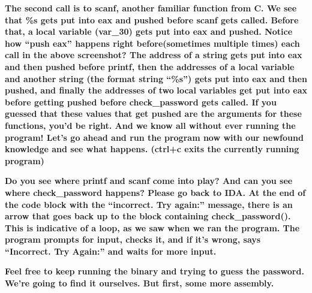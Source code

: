 \documentclass[letterpaper]{article}
\newcommand{\sitfig}[3]{
\begin{figure}[H]
\centering
\makebox[\textwidth][c]{
#2
}
\label{#1}
\end{figure}
}
\newcommand{\sitgfx}[4][scale=1.0]{
\sitfig{#3}{\texttt{[image: \#2]}}{#4}
}
\begin{document}
  
\sitgfx[width=6.5in,height=4.611in]{reversing-img014.png}{fig:unk}{TODO CAPTION}
 \textbf{\newline
The second call is to scanf, another familiar function from C. We see that \%s gets put into eax and pushed before scanf
gets called. Before that, a }\textbf{\textcolor[rgb]{0.21960784,0.4627451,0.11372549}{local variable
}}\textbf{(var\_30) gets put into eax and pushed. Notice how ``push eax'' happens right before(sometimes multiple
times) each call in the above screenshot? The address of a string gets put into eax and then pushed before printf, then
the addresses of a local variable and another string (the format string ``\%s'') gets put into eax and then pushed, and
finally the addresses of two }\textbf{\textcolor[rgb]{0.21960784,0.4627451,0.11372549}{local variables }}\textbf{get
put into eax before getting pushed before check\_password gets called. If you guessed that these values that get pushed
are the arguments for these functions, you'd be right. And we know all without ever running the program! Let's go ahead
and run the program now with our newfound knowledge and see what happens. (ctrl+c exits the currently running
program)\newline
}  
\sitgfx[width=6.5in,height=1.139in]{reversing-img015.png}{fig:unk}{TODO CAPTION}
 

\textbf{Do you see where printf and scanf come into play? And can you see where check\_password happens? Please go back
to IDA. At the end of the code block with the ``incorrect. Try again:'' message, there is an arrow that goes back up to
the block containing check\_password(). This is indicative of a loop, as we saw when we ran the program. The program
prompts for input, checks it, and if it's wrong, says ``Incorrect. Try Again:'' and waits for more input.  }
\sitgfx[width=6.5in,height=3.028in]{reversing-img016.png}{fig:unk}{TODO CAPTION}
 \textbf{\newline
Feel free to keep running the binary and trying to guess the password. We're going to find it ourselves. But first, some
more assembly. \newline
}
\end{document}
